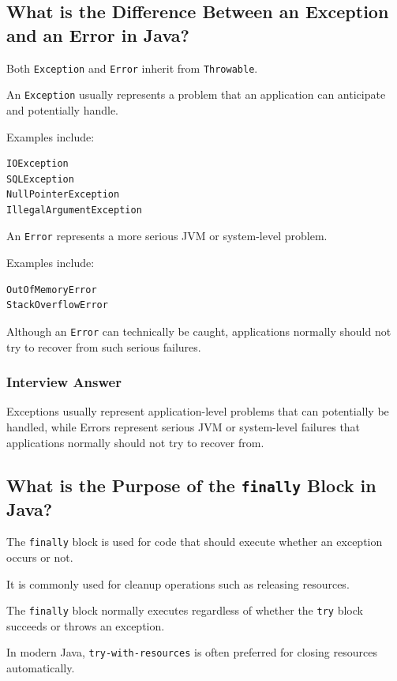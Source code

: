 \documentclass[12pt,a4paper]{article}
\begin{document}
\subsection{What is the Difference Between an Exception and an Error in Java?}

Both \texttt{Exception} and \texttt{Error} inherit from
\texttt{Throwable}.

An \texttt{Exception} usually represents a problem that an application can
anticipate and potentially handle.

Examples include:

\begin{verbatim}
IOException
SQLException
NullPointerException
IllegalArgumentException
\end{verbatim}

An \texttt{Error} represents a more serious JVM or system-level problem.

Examples include:

\begin{verbatim}
OutOfMemoryError
StackOverflowError
\end{verbatim}

Although an \texttt{Error} can technically be caught, applications normally
should not try to recover from such serious failures.

\subsubsection*{Interview Answer}

Exceptions usually represent application-level problems that can potentially
be handled, while Errors represent serious JVM or system-level failures that
applications normally should not try to recover from.

\subsection{What is the Purpose of the \texttt{finally} Block in Java?}

The \texttt{finally} block is used for code that should execute whether an
exception occurs or not.

It is commonly used for cleanup operations such as releasing resources.

The \texttt{finally} block normally executes regardless of whether the
\texttt{try} block succeeds or throws an exception.

In modern Java, \texttt{try-with-resources} is often preferred for closing
resources automatically.
\end{document}
